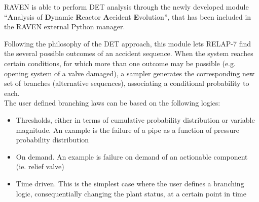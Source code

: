 \label{sec:DETRavenApproach}
RAVEN is able to perform DET analysis through the newly developed module ``\textbf{A}nalysis of \textbf{D}ynamic \textbf{R}eactor \textbf{A}ccident \textbf{E}volution'', that has been included in the RAVEN external Python manager.

Following the philosophy of the DET approach, this module lets RELAP-7 find the several possible outcomes of an accident sequence. When the system reaches certain conditions, for which more than one outcome may be possible (e.g. opening system of a valve damaged), a sampler generates the corresponding new set of branches (alternative sequences), associating a conditional probability to each.
\\The user defined branching laws can be based on the following logics:
\vspace{-5mm}
\begin{itemize}
\itemsep0em
\item Thresholds, either in terms of cumulative probability distribution or variable magnitude. An example is the failure of a pipe as a function of pressure probability distribution
\item On demand. An example is failure on demand of an actionable component (ie. relief valve)
\item Time driven. This is the simplest case where the user defines a branching logic, consequentially changing  the plant status, at a certain point in time
\end{itemize}
\vspace{-5mm}

